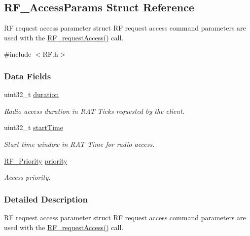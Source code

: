 \subsection{R\+F\+\_\+\+Access\+Params Struct Reference}
\label{struct_r_f___access_params}


R\+F request access parameter struct R\+F request access command parameters are used with the \hyperlink{_r_f_8h_a40a5506c05a11a3cd9d379cedad5b5d0}{R\+F\+\_\+request\+Access()} call.  




{\ttfamily \#include $<$R\+F.\+h$>$}

\subsubsection*{Data Fields}
\begin{DoxyCompactItemize}
\item 
uint32\+\_\+t \hyperlink{struct_r_f___access_params_a0d6adb1c309962431a8b777a44325ade}{duration}
\begin{DoxyCompactList}\small\item\em Radio access duration in R\+A\+T Ticks requested by the client. \end{DoxyCompactList}\item 
uint32\+\_\+t \hyperlink{struct_r_f___access_params_a4ec6ddde388c80d5e2d4b3d8311fcaaf}{start\+Time}
\begin{DoxyCompactList}\small\item\em Start time window in R\+A\+T Time for radio access. \end{DoxyCompactList}\item 
\hyperlink{_r_f_8h_ae5f9a893d178e64e6d0a7a783ea06e32}{R\+F\+\_\+\+Priority} \hyperlink{struct_r_f___access_params_a9ed4a1af207a7f63beb8cfebdd940894}{priority}
\begin{DoxyCompactList}\small\item\em Access priority. \end{DoxyCompactList}\end{DoxyCompactItemize}


\subsubsection{Detailed Description}
R\+F request access parameter struct R\+F request access command parameters are used with the \hyperlink{_r_f_8h_a40a5506c05a11a3cd9d379cedad5b5d0}{R\+F\+\_\+request\+Access()} call. 

